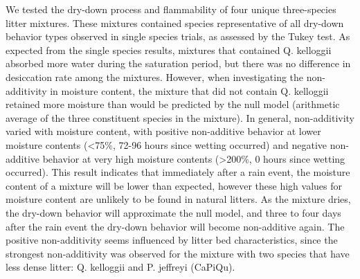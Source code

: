\documentclass[fire,article,submit,moreauthors,pdftex]{Definitions/mdpi}
\begin{document}
We tested the dry-down process and flammability of four unique three-species litter mixtures. These mixtures contained species representative of all dry-down behavior types observed in single species trials, as assessed by the Tukey test. As expected from the single species results, mixtures that contained Q. kelloggii absorbed more water during the saturation period, but there was no difference in desiccation rate among the mixtures. However, when investigating the non-additivity in moisture content, the mixture that did not contain Q. kelloggii retained more moisture than would be predicted by the null model (arithmetic average of the three constituent species in the mixture). In general, non-additivity varied with moisture content, with positive non-additive behavior at lower moisture contents (<75\%, 72-96 hours since wetting occurred) and negative non-additive behavior at very high moisture contents (>200\%, 0 hours since wetting occurred). This result indicates that immediately after a rain event, the moisture content of a mixture will be lower than expected, however these high values for moisture content are unlikely to be found in natural litters. As the mixture dries, the dry-down behavior will approximate the null model, and three to four days after the rain event the dry-down behavior will become non-additive again. The positive non-additivity seems influenced by litter bed characteristics, since the strongest non-additivity was observed for the mixture with two species that have less dense litter: Q. kelloggii and P. jeffreyi (CaPiQu).
\end{document}
